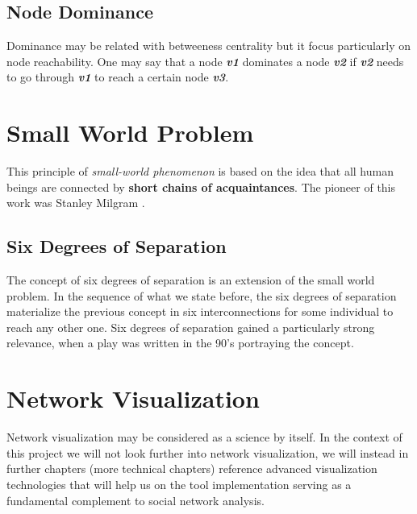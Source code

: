 \subsection{Node Dominance}
Dominance may be related with betweeness centrality but it focus particularly on node reachability. One may say that a node \textit{\textbf{v1}} dominates
a node \textit{\textbf{v2}} if \textit{\textbf{v2}} needs to go through \textit{\textbf{v1}} to reach a certain node \textit{\textbf{v3}}.

\section{Small World Problem}
This principle of \textit{small-world phenomenon} is based on the idea that all human beings are connected by \textbf{short chains of acquaintances}. The pioneer of this work was Stanley Milgram \citep{travers1967small}.

\subsection*{Six Degrees of Separation}
The concept of six degrees of separation is an extension of the small world problem. In the sequence of what we state before, the six degrees of separation materialize the previous concept in six interconnections for some individual to reach any other one. Six degrees of separation gained a particularly strong relevance, when a play was written in the 90's portraying the concept.

\section{Network Visualization}
Network visualization may be considered as a science by itself. In the context of this project we will not look further into network visualization, we will instead
in further chapters (more technical chapters) reference advanced visualization technologies that will help us on the tool implementation serving as a fundamental complement to social network analysis.

